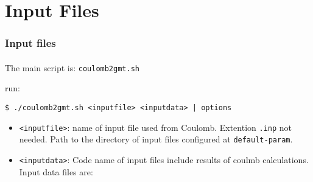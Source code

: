 \section[Inputs]{Input Files}
 
\graphicspath{{Chapter2/Figs/Vector/}{Chapter2/Figs/Raster/}}

\begin{frame}[t,fragile]
  \frametitle{Input files}
  \framesubtitle{}
  \label{ch2fr:inputclb}
The main script is: \texttt{coulomb2gmt.sh}

run:

\begin{verbatim}
$ ./coulomb2gmt.sh <inputfile> <inputdata> | options
\end{verbatim}

\begin{itemize}
\item
  \texttt{\textless{}inputfile\textgreater{}}: name of input file used
  from Coulomb. Extention \texttt{.inp} not needed. Path to the
  directory of input files configured at \texttt{default-param}.
\item
  \texttt{\textless{}inputdata\textgreater{}}: Code name of input files
  include results of coulmb calculations. Input data files are:
\end{itemize}
\end{frame}
\note{} %

